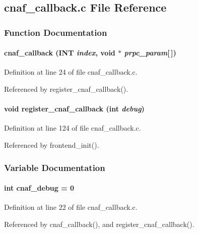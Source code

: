\subsection{cnaf\_\-callback.c File Reference}
\label{cnaf__callback_8c}


\subsubsection{Function Documentation}
\paragraph[{cnaf\_\-callback}]{ cnaf\_\-callback ({\bf INT} {\em index}, \/  void $\ast$ {\em prpc\_\-param}\mbox{[}$\,$\mbox{]})}\hfill\label{cnaf__callback_8c_a2e79e874780c7bf4355f940ac18c7bfa}


Definition at line 24 of file cnaf\_\-callback.c.

Referenced by register\_\-cnaf\_\-callback().
\paragraph[{register\_\-cnaf\_\-callback}]{\setlength{\rightskip}{0pt plus 5cm}void register\_\-cnaf\_\-callback (int {\em debug})}\hfill\label{cnaf__callback_8c_a4c2c646c3b139346601893d06cf6df9d}


Definition at line 124 of file cnaf\_\-callback.c.

Referenced by frontend\_\-init().

\subsubsection{Variable Documentation}
\paragraph[{cnaf\_\-debug}]{\setlength{\rightskip}{0pt plus 5cm}int {\bf cnaf\_\-debug} = 0}\hfill\label{cnaf__callback_8c_a521faf6c5688900946bf634a23423444}


Definition at line 22 of file cnaf\_\-callback.c.

Referenced by cnaf\_\-callback(), and register\_\-cnaf\_\-callback().